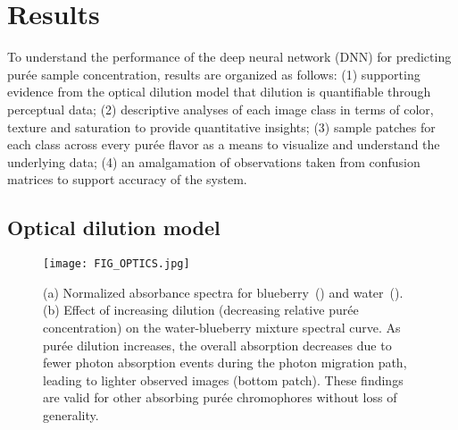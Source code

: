 \documentclass[authoryear]{elsarticle}
\begin{document}
\section{Results}
\label{sec:Results}
To understand the performance of the deep neural network (DNN) for predicting pur\' ee sample concentration, results are organized as follows: (1) supporting evidence from the optical dilution model that dilution is quantifiable through perceptual data; (2) descriptive analyses of each image class in terms of color, texture and saturation to provide quantitative insights; (3) sample patches for each class across every pur\' ee flavor as a means to visualize and understand the underlying data; (4) an amalgamation of observations taken from confusion matrices to support accuracy of the system.

\subsection{Optical dilution model}\label{ssec:Results optical}\begin{figure}
\centering
\texttt{[image: FIG\_OPTICS.jpg]}
\caption{(a) Normalized absorbance spectra for blueberry~(\cite{teoli2016}) and water~(\cite{robin1997}). (b) Effect of increasing dilution (decreasing relative pur\' ee concentration) on the water-blueberry mixture spectral curve. As pur\' ee dilution increases, the overall absorption decreases due to fewer photon absorption events during the photon migration path, leading to lighter observed images (bottom patch). These findings are valid for other absorbing pur\' ee chromophores without loss of generality.}
\label{fig:optics_change}
\end{figure}
\end{document}
